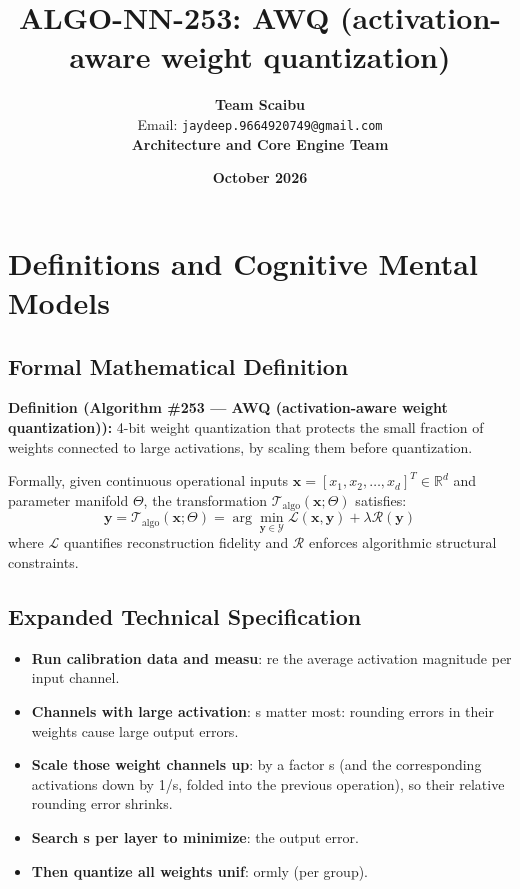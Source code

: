 \documentclass[11pt,a4paper]{article}
\title{\textbf{ALGO-NN-253: AWQ (activation-aware weight quantization)}}
\author{\textbf{Team Scaibu} \\ \small Email: \texttt{jaydeep.9664920749@gmail.com} \\ \small \textbf{Architecture and Core Engine Team}}
\date{\textbf{October 2026}}
\theoremstyle{definition}
\begin{document}
\maketitle

\section{Definitions and Cognitive Mental Models}

\subsection{Formal Mathematical Definition}
\textbf{Definition (Algorithm \#253 --- AWQ (activation-aware weight quantization)):}
4-bit weight quantization that protects the small fraction of weights connected to large activations, by scaling them before quantization.

Formally, given continuous operational inputs $\mathbf{x} = [x_1, x_2, \dots, x_d]^T \in \mathbb{R}^d$ and parameter manifold $\Theta$, the transformation $\mathcal{T}_{\text{algo}}(\mathbf{x}; \Theta)$ satisfies:
{\boldmath
\begin{equation}
\mathbf{y} = \mathcal{T}_{\text{algo}}(\mathbf{x}; \Theta) = \arg\min_{\mathbf{y} \in \mathcal{Y}} \mathcal{L}(\mathbf{x}, \mathbf{y}) + \lambda \mathcal{R}(\mathbf{y})
\end{equation}
}
where $\mathcal{L}$ quantifies reconstruction fidelity and $\mathcal{R}$ enforces algorithmic structural constraints.

\subsection{Expanded Technical Specification}
\begin{itemize}
\item \textbf{Run calibration data and measu}: re the average activation magnitude per input channel.
\item \textbf{Channels with large activation}: s matter most: rounding errors in their weights cause large output errors.
\item \textbf{Scale those weight channels up}:  by a factor s (and the corresponding activations down by 1/s, folded into the previous operation), so their relative rounding error shrinks.
\item \textbf{Search s per layer to minimize}:  the output error.
\item \textbf{Then quantize all weights unif}: ormly (per group).
\end{itemize}
\end{document}
